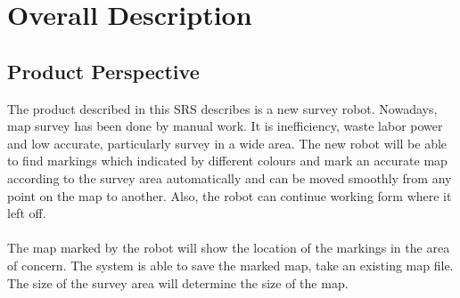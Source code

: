 \documentclass[11pt, a4paper]{article}
\begin{document}
\section{Overall Description}
\subsection{Product Perspective}
The product described in this SRS describes is a new survey robot. Nowadays, map survey has been done by manual work. It is inefficiency, waste labor power and low accurate, particularly survey in a wide area. The new robot will be able to find markings which indicated by different colours and mark an accurate map according to the survey area automatically and can be moved smoothly from any point on the map to another. Also, the robot can continue working form where it left off. \\
\\
The map marked by the robot will show the location of the markings in the area of concern. The system is able to save the marked map, take an existing map file. The size of the survey area will determine the size of the map. 
\end{document}
